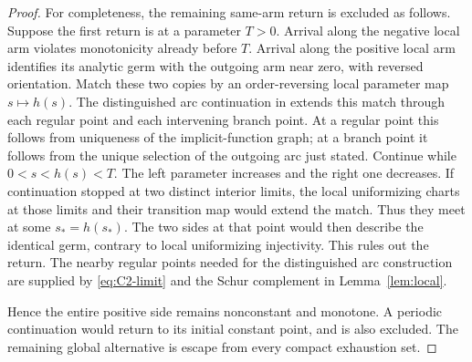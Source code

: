 \documentclass[11pt,a4paper]{article}
\theoremstyle{remark}
\begin{document}
\begin{proof}
For completeness, the remaining same-arm return is excluded as follows.
Suppose the first return is at a parameter $T>0$. Arrival along the
negative local arm violates monotonicity already before $T$. Arrival
along the positive local arm identifies its analytic germ with the
outgoing arm near zero, with reversed orientation. Match these two
copies by an order-reversing local parameter map $s\mapsto h(s)$.
The distinguished arc continuation in \cite[Figure 2]{CSV} extends this
match through each regular point and each intervening branch point.
At a regular point this follows from uniqueness of the implicit-function
graph; at a branch point it follows from the unique selection of the
outgoing arc just stated.
Continue while $0<s<h(s)<T$. The left parameter increases and the right
one decreases. If continuation stopped at two distinct interior limits,
the local uniformizing charts at those limits and their transition map
would extend the match.
Thus they meet at some $s_*=h(s_*)$. The two sides at that point would
then describe the identical germ, contrary to local uniformizing
injectivity. This rules out the return. The nearby regular points
needed for the distinguished arc construction are supplied by
\eqref{eq:C2-limit} and the Schur complement in Lemma~\ref{lem:local}.

Hence the entire positive side remains nonconstant and monotone. A
periodic continuation would return to its initial constant point, and is
also excluded. The remaining global alternative is escape from every
compact exhaustion set.
\end{proof}
\end{document}
